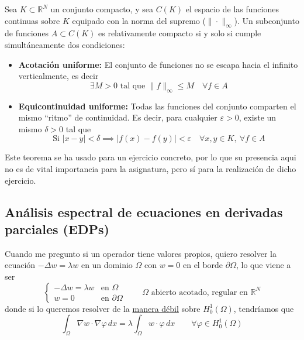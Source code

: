 \documentclass[12pt]{book}
\newcommand{\tbf}{\textbf}
\begin{document}
\begin{teo}
    Sea $K \subset \mathbb{R}^N$ un conjunto compacto, y sea $C(K)$ el espacio de las funciones continuas sobre $K$ equipado con la norma del supremo ($\|\cdot\|_\infty$). Un subconjunto de funciones $A \subset C(K)$ es relativamente compacto  si y solo si cumple simultáneamente dos condiciones:
    \begin{itemize}
        \item \tbf{Acotación uniforme:} El conjunto de funciones no se escapa hacia el infinito verticalmente, es decir
        \begin{equation*}
            \exists M > 0 \text{ tal que } \|f\|_\infty \leq M \quad \forall f \in A
        \end{equation*}
        \item \tbf{Equicontinuidad uniforme:} Todas las funciones del conjunto comparten el mismo ``ritmo'' de continuidad. Es decir, para cualquier $\varepsilon > 0$, existe un mismo $\delta > 0$ tal que
        \begin{equation*}
            \text{Si } |x - y| < \delta \implies |f(x) - f(y)| < \varepsilon \quad \forall x,y \in K, \ \forall f \in A
        \end{equation*}
    \end{itemize}
\end{teo}

\begin{observacion}
    Este teorema se ha usado para un ejercicio concreto, por lo que su presencia aqui no es de vital importancia para la asignatura, pero sí para la realización de dicho ejercicio.
\end{observacion}

\subsection{Análisis espectral de ecuaciones en derivadas parciales (EDPs)}

\noindent
Cuando me pregunto si un operador tiene valores propios, quiero resolver la ecuación $-\Delta w = \lambda w$ en un dominio $\Omega$ con $w=0$ en el borde $\partial\Omega$, lo que viene a ser
\begin{equation*}
    \begin{cases} -\Delta w = \lambda w & \text{en } \Omega \\ w = 0 & \text{en } \partial\Omega \end{cases} \qquad \Omega \text{ abierto acotado, regular en } \mathbb{R}^N
\end{equation*}
donde si lo queremos resolver de la \underline{manera débil} sobre $H_0^1(\Omega)$, tendríamos que
\begin{equation*}
    \int_{\Omega} \nabla w \cdot \nabla \varphi \, dx = \lambda \int_{\Omega} w \cdot \varphi \, dx \qquad \forall \varphi \in H_0^1(\Omega)
\end{equation*}
\end{document}
